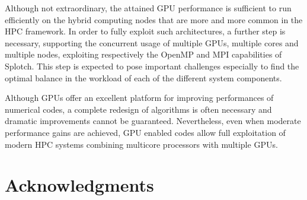 \documentclass[1p]{elsarticle}
\begin{document}
Although not extraordinary, the attained GPU performance is sufficient 
to run efficiently on the hybrid computing nodes that are more and 
more common in the HPC framework. In order to fully exploit such architectures, 
a further step is necessary, supporting the concurrent usage of 
multiple GPUs, multiple cores and multiple nodes, exploiting respectively the OpenMP and
MPI capabilities of Splotch. This step is expected to pose important 
challenges especially to find the optimal balance in the workload of each of the different 
system components.

Although GPUs offer an excellent platform for improving performances of numerical codes, a complete redesign of algorithms is often necessary and dramatic improvements cannot be guaranteed. Nevertheless, even when moderate performance gains are achieved, GPU enabled codes allow full exploitation of modern HPC systems combining multicore processors with multiple GPUs. 

\section*{Acknowledgments}


	
\end{document}
